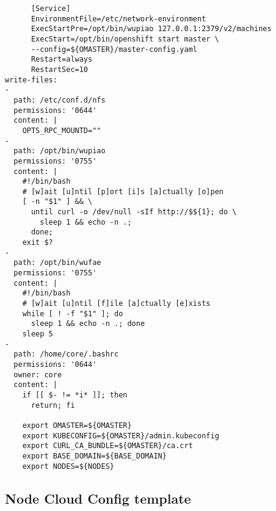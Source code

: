 \begin{verbatim}
      [Service]
      EnvironmentFile=/etc/network-environment
      ExecStartPre=/opt/bin/wupiao 127.0.0.1:2379/v2/machines
      ExecStart=/opt/bin/openshift start master \
      --config=${OMASTER}/master-config.yaml
      Restart=always
      RestartSec=10
write-files:
-
  path: /etc/conf.d/nfs
  permissions: '0644'
  content: |
    OPTS_RPC_MOUNTD=""
-
  path: /opt/bin/wupiao
  permissions: '0755'
  content: |
    #!/bin/bash
    # [w]ait [u]ntil [p]ort [i]s [a]ctually [o]pen
    [ -n "$1" ] && \
      until curl -o /dev/null -sIf http://$${1}; do \
        sleep 1 && echo -n .;
      done;
    exit $?
-
  path: /opt/bin/wufae
  permissions: '0755'
  content: |
    #!/bin/bash
    # [w]ait [u]ntil [f]ile [a]ctually [e]xists
    while [ ! -f "$1" ]; do
      sleep 1 && echo -n .; done
    sleep 5
-
  path: /home/core/.bashrc
  permissions: '0644'
  owner: core
  content: |
    if [[ $- != *i* ]]; then
      return; fi

    export OMASTER=${OMASTER}
    export KUBECONFIG=${OMASTER}/admin.kubeconfig
    export CURL_CA_BUNDLE=${OMASTER}/ca.crt
    export BASE_DOMAIN=${BASE_DOMAIN}
    export NODES=${NODES}
\end{verbatim}

\subsection{Node Cloud Config
template}\label{node-cloud-config-template}

